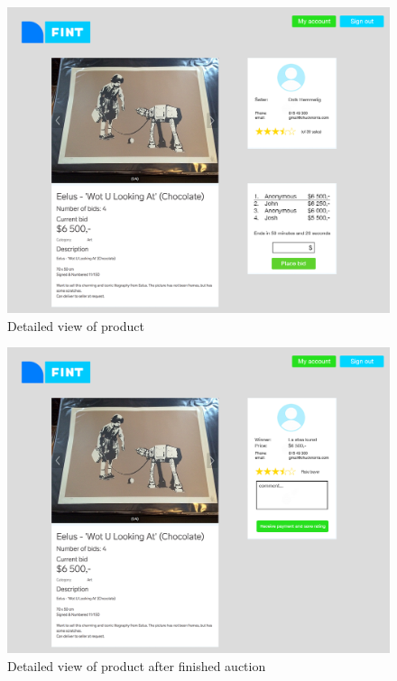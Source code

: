 \begin{figure}
	\caption{Detailed view of product}
	\centering
		\includegraphics[scale=0.38]{figures/detailed-view-of-product}
\end{figure}

\begin{figure}
	\caption{Detailed view of product after finished auction}
	\centering
		\includegraphics[scale=0.38]{figures/detailed-view-finished-aucution}
\end{figure}

